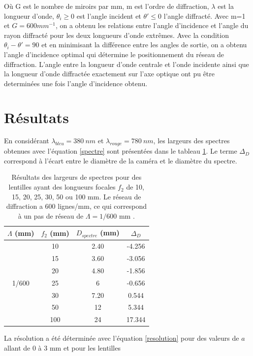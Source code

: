 \documentclass[conference]{IEEEtran}
\begin{document}
Où G est le nombre de miroirs par mm, m est l'ordre de diffraction, $\lambda$ est la longueur d'onde,
$\theta_i \ge 0$ est l'angle incident et $\theta' \le 0$ l'angle diffracté. Avec m=1 et $G=600mm^{-1}$, 
on a obtenu les relations entre l'angle d'incidence et l'angle du rayon diffracté pour les deux longueurs 
d'onde extrêmes. Avec la condition $\theta_i-\theta'=90$ et en minimisant la différence entre les angles 
de sortie, on a obtenu l'angle d'incidence optimal qui détermine le positionnement du réseau de diffraction.
L'angle entre la longueur d'onde centrale et l'onde incidente ainsi que la longueur d'onde diffractée 
exactement sur l'axe optique ont pu être determinées une fois l'angle d'incidence obtenu.



\section{Résultats \label{resultats}}
En considérant $\lambda_{bleu}=380\ nm$ et $\lambda_{rouge}=780\ nm$, les largeurs des spectres obtenues avec l'équation \ref{spectre} sont présentées
dans le tableau \ref{largeur_spectre}. Le terme $\Delta_D$ correspond à l'écart entre le diamètre de la caméra et le diamètre du spectre.
\begin{table}[H]
    \caption{Résultats des largeurs de spectres pour des lentilles ayant des longueurs focales
    $f_2$ de 10, 15, 20, 25, 30, 50 ou 100 mm. Le réseau de diffraction a 600 lignes/mm, ce qui correspond à un pas de réseau
    de $\Lambda=1/600$ mm \cite{grating}.}    
    \centering
    \begin{tabular}{c|c|c|c}
    $\Lambda$ (mm) & $f_2$ (mm) & $D_{spectre}$ (mm) & $\Delta_D$ \\
    \hline
    \hline
    \multirow{7}{*}{1/600} & 10 & 2.40 & -4.256 \\
    & 15 & 3.60 & -3.056 \\
    & 20 & 4.80 & -1.856 \\
    & 25 & 6 & -0.656 \\
    & 30 & 7.20 & 0.544 \\
    & 50 & 12 & 5.344 \\
    & 100 & 24 & 17.344\\
    \hline
    \end{tabular}
    \label{largeur_spectre}
\end{table}
La résolution a été déterminée avec l'équation \ref{resolution} pour des valeurs de $a$ allant de 0 à 3 mm et pour les lentilles
\end{document}
